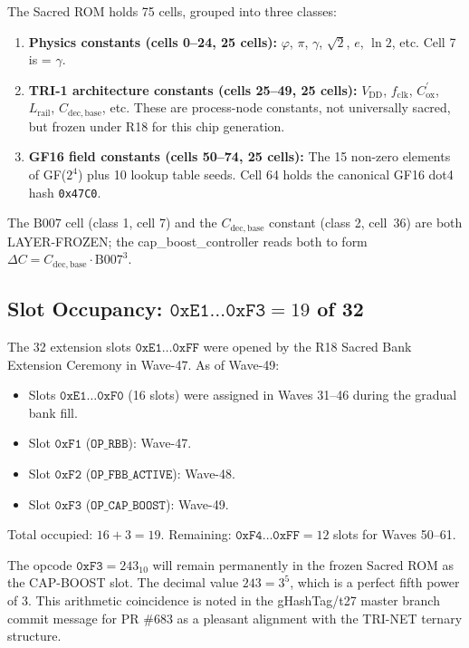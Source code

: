 \documentclass[12pt,a4paper]{report}
\theoremstyle{plain}
\theoremstyle{definition}
\theoremstyle{remark}
\newcommand{\Vdd}{V_{\mathrm{DD}}}
\newcommand{\Lrail}{L_{\mathrm{rail}}}
\newcommand{\Cbase}{C_{\mathrm{dec,base}}}
\newcommand{\deltaC}{\Delta C}
\newcommand{\fclk}{f_{\mathrm{clk}}}
\newcommand{\Bseven}{\mathrm{B007}}
\begin{document}
The Sacred ROM holds 75 cells, grouped into three classes:
\begin{enumerate}[leftmargin=1.5em]
  \item \textbf{Physics constants (cells 0--24, 25 cells):}
    $\varphi$, $\pi$, $\gamma$, $\sqrt{2}$, $e$, $\ln 2$, etc.
    Cell 7 is \Bseven{} = $\gamma$.
  \item \textbf{TRI-1 architecture constants (cells 25--49, 25 cells):}
    $\Vdd$, $\fclk$, $C_{\mathrm{ox}}^{\prime}$, $\Lrail$, $\Cbase$, etc.
    These are process-node constants, not universally sacred, but frozen
    under R18 for this chip generation.
  \item \textbf{GF16 field constants (cells 50--74, 25 cells):}
    The 15 non-zero elements of GF($2^{4}$) plus 10 lookup table seeds.
    Cell 64 holds the canonical GF16 dot4 hash \texttt{0x47C0}.
\end{enumerate}

The $\Bseven$ cell (class 1, cell 7) and the $\Cbase$ constant (class 2,
cell~36) are both LAYER-FROZEN; the cap\_boost\_controller reads both
to form $\deltaC = \Cbase \cdot \Bseven^{3}$.

\subsection{Slot Occupancy: $\texttt{0xE1}\ldots\texttt{0xF3} = 19$ of 32}
\label{ssec:slot-occupancy-detail}

The 32 extension slots $\texttt{0xE1}\ldots\texttt{0xFF}$ were opened
by the R18 Sacred Bank Extension Ceremony in Wave-47.
As of Wave-49:
\begin{itemize}[leftmargin=1.5em]
  \item Slots $\texttt{0xE1}\ldots\texttt{0xF0}$ (16 slots) were assigned
    in Waves 31--46 during the gradual bank fill.
  \item Slot $\texttt{0xF1}$ ($\texttt{OP\_RBB}$): Wave-47.
  \item Slot $\texttt{0xF2}$ ($\texttt{OP\_FBB\_ACTIVE}$): Wave-48.
  \item Slot $\texttt{0xF3}$ ($\texttt{OP\_CAP\_BOOST}$): Wave-49.
\end{itemize}
Total occupied: $16 + 3 = 19$.
Remaining: $\texttt{0xF4}\ldots\texttt{0xFF} = 12$ slots for Waves 50--61.

The opcode $\texttt{0xF3} = 243_{10}$ will remain permanently in the frozen
Sacred ROM as the CAP-BOOST slot.
The decimal value $243 = 3^{5}$, which is a perfect fifth power of 3.
This arithmetic coincidence is noted in the gHashTag/t27 master branch
commit message for PR \#683 as a pleasant alignment with the TRI-NET
ternary structure.
\end{document}
